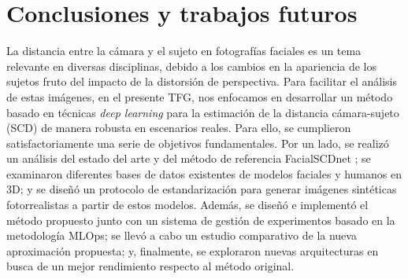 \chapter{Conclusiones y trabajos futuros}

\thispagestyle{empty}

La distancia entre la cámara y el sujeto en fotografías faciales es un tema relevante en diversas disciplinas, debido a los cambios en la apariencia de los sujetos fruto del impacto de la distorsión de perspectiva. Para facilitar el análisis de estas imágenes, en el presente TFG, nos enfocamos en desarrollar un método basado en técnicas \textit{deep learning} para la estimación de la distancia cámara-sujeto (SCD) de manera robusta en escenarios reales. Para ello, se cumplieron satisfactoriamente una serie de objetivos fundamentales. Por un lado, se realizó un análisis del estado del arte y del método de referencia FacialSCDnet \cite{14}; se examinaron diferentes bases de datos existentes de modelos faciales y humanos en 3D; y se diseñó un protocolo de estandarización para generar imágenes sintéticas fotorrealistas a partir de estos modelos. Además, se diseñó e implementó el método propuesto junto con un sistema de gestión de experimentos basado en la metodología MLOps; se llevó a cabo un estudio comparativo de la nueva aproximación propuesta; y, finalmente, se exploraron nuevas arquitecturas en busca de un mejor rendimiento respecto al método original.

